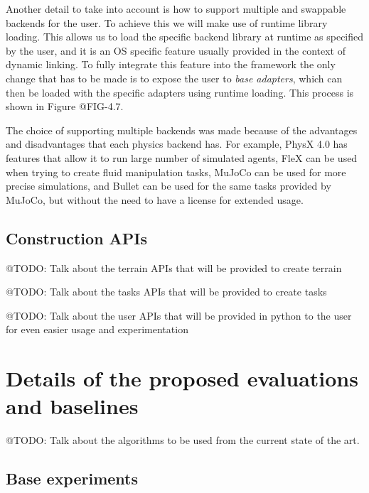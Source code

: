 \figBridgePattern


Another detail to take into account is how to support multiple and swappable backends
for the user. To achieve this we will make use of runtime library loading. This allows us
to load the specific backend library at runtime as specified by the user, and it is an OS specific
feature usually provided in the context of dynamic linking. To fully integrate
this feature into the framework the only change that has to be made is to expose the user 
to \textit{base adapters}, which can then be loaded with the specific adapters using runtime loading.
This process is shown in Figure @FIG-4.7.




The choice of supporting multiple backends was made because of the advantages and
disadvantages that each physics backend has. For example, PhysX 4.0 has features that
allow it to run large number of simulated agents, FleX can be used when trying to
create fluid manipulation tasks, MuJoCo can be used for more precise simulations, and
Bullet can be used for the same tasks provided by MuJoCo, but without the need to have
a license for extended usage.

\subsection{Construction APIs}

@TODO: Talk about the terrain APIs that will be provided to create terrain

@TODO: Talk about the tasks APIs that will be provided to create tasks

@TODO: Talk about the user APIs that will be provided in python to the user for
       even easier usage and experimentation

\section{Details of the proposed evaluations and baselines}

@TODO: Talk about the algorithms to be used from the current state of the art.

\subsection{Base experiments}

